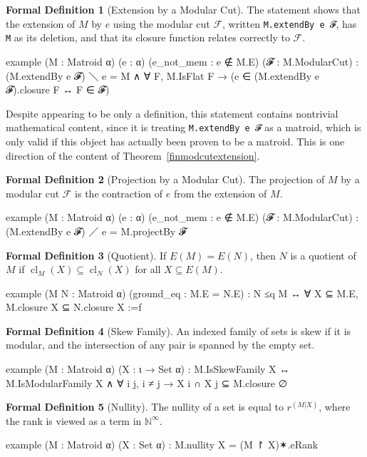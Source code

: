 \documentclass{amsart}
\theoremstyle{plain}
\theoremstyle{definition}
\newcommand{\cF}{\mathcal{F}}
\newcommand{\enn}{\mathbb{N}^{\infty}}
\DeclareMathOperator{\cl}{cl}
\renewcommand{\ss}{\subseteq}
\newcommand{\smalltt}[1]{{\small\texttt{#1}}}
\newtheorem*{fdef}{Formal Definition}
\begin{document}
\begin{fdef}[Extension by a Modular Cut]
  The statement shows that the extension of $M$ by $e$ 
  using the modular cut $\cF$, written
  \smalltt{M.extendBy e 𝓕}, has \smalltt{M} as its deletion, 
  and that its closure function relates correctly to $\cF$. 
  \begin{leancode}
example (M : Matroid α) (e : α) (e_not_mem : e ∉ M.E) (𝓕 : M.ModularCut) :
  (M.extendBy e 𝓕) ＼ {e} = M ∧ 
  ∀ F, M.IsFlat F → (e ∈ (M.extendBy e 𝓕).closure F ↔ F ∈ 𝓕)
  \end{leancode}
  Despite appearing to be only a definition, 
  this statement contains nontrivial mathematical content, 
  since it is treating \smalltt{M.extendBy e 𝓕} as a matroid, 
  which is only valid if this object has actually been proven to be a matroid. 
  This is one direction of the content of Theorem~\ref{finmodcutextension}.
\end{fdef}

\begin{fdef}[Projection by a Modular Cut]
  The projection of $M$ by a modular cut $\cF$ is the contraction of $e$
  from the extension of $M$. 
  \begin{leancode}
example (M : Matroid α) (e : α) (e_not_mem : e ∉ M.E) (𝓕 : M.ModularCut) :
  (M.extendBy e 𝓕) ／ {e} = M.projectBy 𝓕
  \end{leancode}
\end{fdef}

\begin{fdef}[Quotient] 
  If $E(M) = E(N)$, then $N$ is a quotient of $M$ if 
  $\cl_M(X) \ss \cl_N(X)$ for all $X \ss E(M)$.
  \begin{leancode}
example (M N : Matroid α) (ground_eq : M.E = N.E) :
  N ≤q M ↔ ∀ X ⊆ M.E, M.closure X ⊆ N.closure X :=f
  \end{leancode}
\end{fdef}

\begin{fdef}[Skew Family]
  An indexed family of sets is skew if it is modular,
  and the intersection of any pair is spanned by the empty set. 
  \begin{leancode}
example (M : Matroid α) (X : ι → Set α) :
  M.IsSkewFamily X ↔ 
    M.IsModularFamily X ∧ ∀ i j, i ≠ j → X i ∩ X j ⊆ M.closure ∅
  \end{leancode}
\end{fdef}

\begin{fdef}[Nullity]
  The nullity of a set is equal to $r^(M| X)$, 
  where the rank is viewed as a term in $\enn$. 
  \begin{leancode}
example (M : Matroid α) (X : Set α) :
  M.nullity X = (M ↾ X)✶.eRank
  \end{leancode}
\end{fdef}
\end{document}

